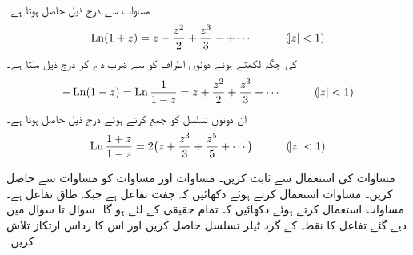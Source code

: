 \quad {}\\
مساوات  سے درج ذیل حاصل ہوتا ہے۔
\begin{align}
\operatorname{Ln} (1+z)=z-\frac{z^2}{2}+\frac{z^3}{3}-+\cdots\quad \quad \quad (\abs{z}<1)
\end{align}
 کی جگہ  لکھتے ہوئے دونوں اطراف کو  سے ضرب دے کر درج ذیل ملتا ہے۔
\begin{align}
-\operatorname{Ln}(1-z)=\operatorname{Ln} \frac{1}{1-z}=z+\frac{z^2}{2}+\frac{z^3}{3}+\cdots \quad \quad \quad (\abs{z}<1)
\end{align}
ان دونوں تسلسل کو جمع کرتے ہوئے درج ذیل حاصل ہوتا ہے۔
\begin{align}\label{مساوات_ٹیلر_لوگارتھمی_کسر}
\operatorname{Ln} \frac{1+z}{1-z}=2\big(z+\frac{z^3}{3}+\frac{z^5}{5}+\cdots\big)\quad \quad \quad (\abs{z}<1)
\end{align}

\quad مساوات  کی استعمال سے  ثابت کریں۔
\quad مساوات  اور مساوات  کو مساوات  سے حاصل کریں۔
\quad
مساوات  استعمال کرتے ہوئے دکھائیں کہ  جفت تفاعل ہے جبکہ  طاق تفاعل ہے۔ 
\quad
مساوات  استعمال کرتے ہوئے دکھائیں کہ تمام حقیقی  کے لئے  ہو گا۔
سوال  تا سوال  میں دیے گئے تفاعل کا نقطہ  کے گرد ٹیلر تسلسل حاصل کریں اور اس کا رداس ارتکاز  تلاش کریں۔

